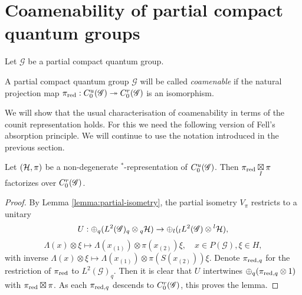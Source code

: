 \section{Coamenability of partial compact quantum groups}

Let $\mathscr{G}$ be a partial compact quantum group. 


\begin{Def} A partial compact quantum group $\mathscr{G}$ will be called \emph{coamenable} if the natural projection map $\pi_{\operatorname{\mathrm{red}}}:C^{u}_{0}(\mathscr{G})\twoheadrightarrow C^{r}_{0}(\mathscr{G})$ is an isomorphism.
\end{Def}


We will show that the usual characterisation of coamenability in terms of the counit representation holds. For this we need the following version of Fell's absorption principle. We will continue to use the notation introduced in the previous section.

\begin{Lem}\label{LemFell} Let $(\mathcal{H},\pi)$ be a non-degenerate $^*$-representation of $C^{u}_{0}(\mathscr{G})$. Then $\pi_{\operatorname{\mathrm{red}}}\underset{I}{\boxtimes} \pi$ factorizes over $C^{r}_{0}(\mathscr{G})$.
\end{Lem}

\begin{proof}  
  By Lemma \ref{lemma:partial-isometry}, the partial isometry
  $V_{\pi}$ restricts to a unitary \[U: \oplus_q
  (L^2(\mathscr{G})_q\otimes {}_q\mathcal{H} ) \rightarrow \oplus_l ({}_l
  L^2(\mathscr{G})\otimes {}^l\mathcal{H}),\]\[\Lambda(x)\otimes \xi \mapsto
  \Lambda(x_{(1)})\otimes \pi(x_{(2)})\xi,\quad x\in
  P(\mathscr{G}),\xi\in H,\] with inverse $\Lambda(x)\otimes \xi
  \mapsto \Lambda(x_{(1)})\otimes
  \pi(S(x_{(2)}))\xi$. %
  Denote $\pi_{\operatorname{\mathrm{red}},q}$ for the restriction of $\pi_{\operatorname{\mathrm{red}}}$ to
  $L^2(\mathscr{G})_q$. Then it is clear that $U$ intertwines
  $\oplus_q (\pi_{\operatorname{\mathrm{red}},q}\otimes 1)$ with $\pi_{\operatorname{\mathrm{red}}}\boxtimes
  \pi$. As each $\pi_{\operatorname{\mathrm{red}},q}$ descends to $C^{r}_{0}(\mathscr{G})$, this proves the
  lemma.
\end{proof} 

